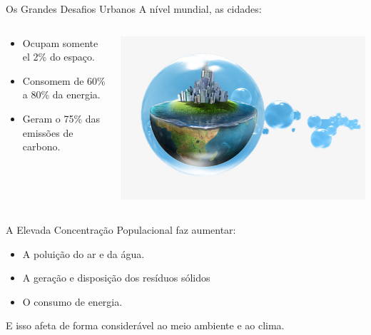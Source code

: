 \documentclass{beamer}
\begin{document}
\begin{frame}{Os Grandes Desafios Urbanos}
A nível mundial, as cidades: 
\begin{columns}
\begin{column}{0.7\textwidth}
\begin{itemize}
\item Ocupam somente el 2\% do espaço.
\item Consomem de 60\% a 80\% da energia.
\item Geram o 75\% das emissões de carbono.

\end{itemize}
\end{column}
\begin{column}{0.3\textwidth}  %
    \includegraphics[width=.9\textwidth]{img/mundo_ciudad.jpg}    
\end{column}
\end{columns}

\begin{alertblock}{A Elevada Concentração Populacional faz aumentar:}
\begin{itemize}
 \item A poluição do ar e da água.
 \item A geração e disposição dos resíduos sólidos 
 \item O consumo de energia. 
\end{itemize}
E isso afeta de forma considerável ao meio ambiente e ao clima. 



\end{alertblock}


\end{frame}
\end{document}

